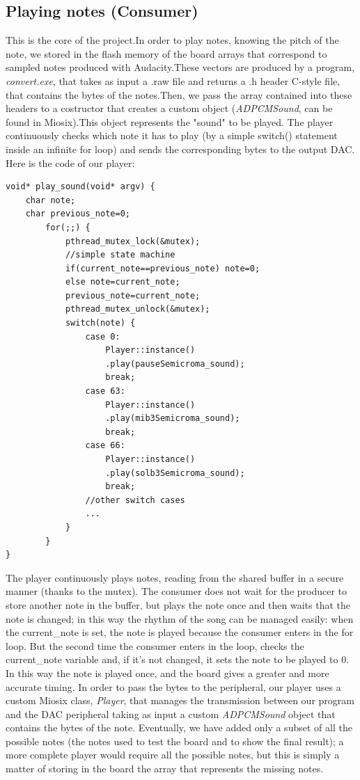 \documentclass[12pt]{article}
\begin{document}
\subsection{Playing notes (Consumer)}\label{subsec:playing}
This is the core of the project.In order to play notes, knowing the pitch of the note, we stored in the flash memory of the board arrays that correspond to sampled notes produced with Audacity.These vectors are produced by a program, \textit{convert.exe}, that takes as input a .raw file and returns a .h header C-style file, that contains the bytes of the notes.Then, we pass the array contained into these headers to a costructor that creates a custom object (\textit{ADPCMSound}, can be found in Miosix).This object represents the "sound" to be played.\newline
The player continuously checks which note it has to play (by a simple switch() statement inside an infinite for loop) and sends the corresponding bytes to the output DAC. Here is the code of our player:\newpage

\begin{lstlisting}
void* play_sound(void* argv) {
	char note;
	char previous_note=0;
		for(;;) {
			pthread_mutex_lock(&mutex);
			//simple state machine
			if(current_note==previous_note) note=0;
			else note=current_note;
			previous_note=current_note;
			pthread_mutex_unlock(&mutex);
			switch(note) {
				case 0:
					Player::instance()
					.play(pauseSemicroma_sound);
					break;
				case 63:
					Player::instance()
					.play(mib3Semicroma_sound);
					break;
				case 66:
					Player::instance()
					.play(solb3Semicroma_sound);
					break;
				//other switch cases
				...
			}
		}
}
\end{lstlisting}
The player continuously plays notes, reading from the shared buffer in a secure manner (thanks to the mutex). The consumer does not wait for the producer to store another note in the buffer, but plays the note once and then waits that the note is changed; in this way the rhythm of the song can be managed easily: when the current\_note is set, the note is played because the consumer enters in the for loop. But the second time the consumer enters in the loop, checks the current\_note variable and, if it's not changed, it sets the note to be played to 0. In this way the note is played once, and the board gives a greater and more accurate timing.\newline
In order to pass the bytes to the peripheral, our player uses a custom Miosix class, \textit{Player}, that manages the transmission between our program and the DAC peripheral taking as input a custom \textit{ADPCMSound} object that contains the bytes of the note. Eventually, we have added only a subset of all the possible notes (the notes used to test the board and to show the final result); a more complete player would require all the possible notes, but this is simply a matter of storing in the board the array that represents the missing notes.
\end{document}
